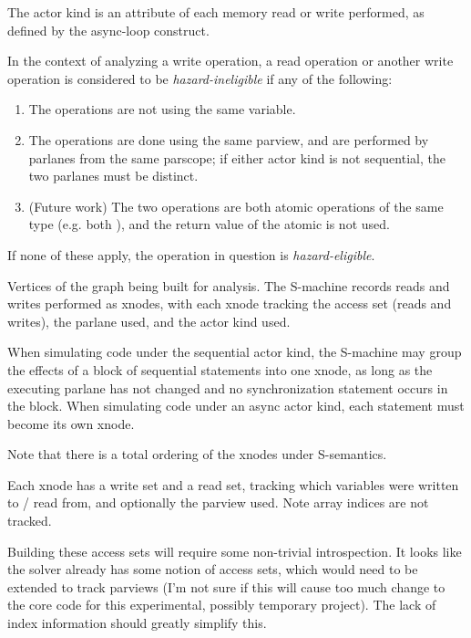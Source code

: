 \filbreak
{}
The actor kind is an attribute of each memory read or write performed, as defined by the async-loop construct.

\filbreak
{} In the context of analyzing a write operation, a read operation or another write operation is considered to be \textit{hazard-ineligible} if any of the following:

\begin{enumerate}
  \item The operations are not using the same variable.
  \item The operations are done using the same parview, and are performed by parlanes from the same parscope; if either actor kind is not sequential, the two parlanes must be distinct.
  \item (Future work) The two operations are both atomic operations of the same type (e.g. both ), and the return value of the atomic is not used.
\end{enumerate}

If none of these apply, the operation in question is \textit{hazard-eligible}.

\filbreak
{}
Vertices of the graph being built for analysis.
The S-machine records reads and writes performed as xnodes, with each xnode tracking the access set (reads and writes), the parlane used, and the actor kind used.

When simulating code under the sequential actor kind, the S-machine may group the effects of a block of sequential statements into one xnode, as long as the executing parlane has not changed and no synchronization statement occurs in the block. When simulating code under an async actor kind, each statement must become its own xnode.

Note that there is a total ordering of the xnodes under S-semantics.

\filbreak
{} Each xnode has a write set and a read set, tracking which variables were written to / read from, and optionally the parview used.
Note array indices are not tracked.

 Building these access sets will require some non-trivial introspection.
It looks like the solver already has some notion of access sets, which would need to be extended to track parviews (I'm not sure if this will cause too much change to the core code for this experimental, possibly temporary project).
The lack of index information should greatly simplify this.

